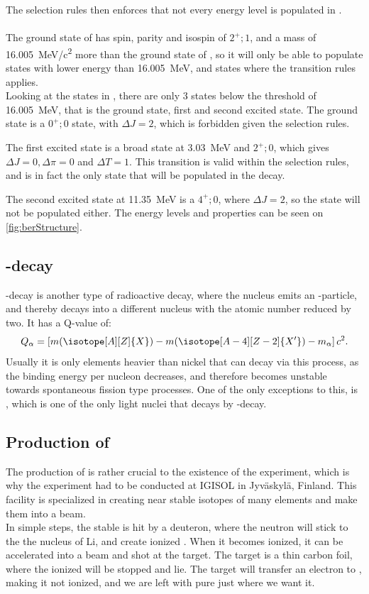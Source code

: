 The selection rules then enforces that not every energy level is populated in \ber. 
\\
\\
The ground state of \li has spin, parity and isospin of $2^+; 1$, and a mass of \SI{16.005}{MeV/c^2} more than the ground state of \ber, so it will only be able to populate states with lower energy than \SI{16.005}{MeV}, and states where the transition rules applies.\\
Looking at the states in \ber, there are only 3 states below the threshold of \SI{16.005}{MeV}, that is the ground state, first and second excited state. 
The ground state is a $0^+; 0$ state, with $\Delta J = 2$, which is forbidden given the selection rules. 

The first excited state is a broad state at \SI{3.03}{MeV} and $2^+; 0$, which gives $\Delta J = 0, \Delta \pi = 0$ and $\Delta T = 1$. This transition is valid within the selection rules, and is in fact the only state that will be populated in the decay.

The second excited state at \SI{11.35}{MeV} is a  $4^+; 0$, where $\Delta J = 2$, so the state will not be populated either.
The energy levels and properties can be seen on \cref{fig:berStructure}.
\subsection{\al-decay}
\al-decay is another type of radioactive decay, where the nucleus emits an \al-particle, and thereby decays into a different nucleus with the atomic number reduced by two.  
It has a Q-value of:
\begin{equation}
Q_\alpha =  \left[ m (\isotope[A][Z]{X}) - m(\isotope[A-4][Z-2]{X'})  	- m_\alpha	 \right] c^2.
\end{equation}
Usually it is only elements heavier than nickel that can decay via this process, as the binding energy per nucleon decreases, and therefore becomes unstable towards spontaneous fission type processes. 
One of the only exceptions to this, is \ber, which is one of the only light nuclei that decays by \al-decay.

\subsection{Production of \li}
The production of \li is rather crucial to the existence of the experiment, which is why the experiment had to be conducted at IGISOL in Jyväskylä, Finland. This facility is specialized in creating near stable isotopes of many elements and make them into a beam. \\
In simple steps, the stable  is hit by a deuteron, where the neutron will stick to the the nucleus of \isotope[7]Li, and create ionized \li. When it becomes ionized, it can be accelerated into a beam and shot at the target. The target is a thin carbon foil, where the ionized \li will be stopped and lie. The target will transfer an electron to \li, making it not ionized, and we are left with pure \li just where we want it.  


